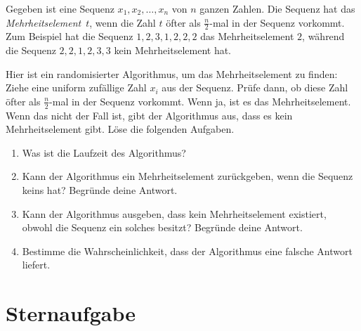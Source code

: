 \documentclass{uebung_cs}
\begin{document}
\begin{aufgabe}[Mehrheit]
	Gegeben ist eine Sequenz $x_1,x_2,\dots,x_n$ von $n$ ganzen Zahlen. Die Sequenz hat das \textit{Mehrheitselement}~$t$, wenn die Zahl $t$ öfter als $\frac{n}{2}$-mal in der Sequenz vorkommt. Zum Beispiel hat die Sequenz $1,2,3,1,2,2,2$ das Mehrheitselement $2$, während die Sequenz $2,2,1,2,3,3$ kein Mehrheitselement hat.
	
	Hier ist ein randomisierter Algorithmus, um das Mehrheitselement zu finden: Ziehe eine uniform zufällige Zahl $x_i$ aus der Sequenz. Prüfe dann, ob diese Zahl öfter als $\frac{n}{2}$-mal in der Sequenz vorkommt. Wenn ja, ist es das Mehrheitselement. Wenn das nicht der Fall ist, gibt der Algorithmus aus, dass es kein Mehrheitselement gibt. Löse die folgenden Aufgaben.
	\begin{enumerate}
		\item Was ist die Laufzeit des Algorithmus?
		\item Kann der Algorithmus ein Mehrheitselement zurückgeben, wenn die Sequenz keins hat? Begründe deine Antwort.
		\item Kann der Algorithmus ausgeben, dass kein Mehrheitselement existiert, obwohl die Sequenz ein solches besitzt? Begründe deine Antwort.
		\item Bestimme die Wahrscheinlichkeit, dass der Algorithmus eine falsche Antwort liefert.
	\end{enumerate}
\end{aufgabe}

\section*{Sternaufgabe}
\end{document}
